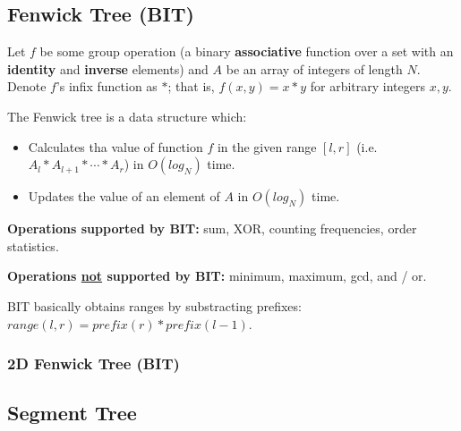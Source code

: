 \documentclass[letterpaper,landscape]{article}
\begin{document}
\subsection{Fenwick Tree (BIT)}

Let $f$ be some group operation (a binary \textbf{associative} function over a set with an \textbf{identity} and \textbf{inverse} elements) and $A$ be an array of integers of length $N$. Denote $f$'s infix function as $*$; that is, $f(x,y) = x * y$ for arbitrary integers $x, y$.

The Fenwick tree is a data structure which:

\begin{itemize}
  \item Calculates tha value of function $f$ in the given range $[l,r]$ (i.e. $A_l * A_{l+1} * \cdots * A_r$) in $O(log_N)$ time.
  \item Updates the value of an element of $A$ in $O(log_N)$ time.
\end{itemize}

\textbf{Operations supported by BIT:} sum, XOR, counting frequencies, order statistics.

\textbf{Operations \underline{not} supported by BIT:} minimum, maximum, gcd, and / or.

BIT basically obtains ranges by substracting prefixes: $range(l,r) = prefix(r) * prefix(l-1)$.



\subsubsection{2D Fenwick Tree (BIT)}



\subsection{Segment Tree}


\end{document}

